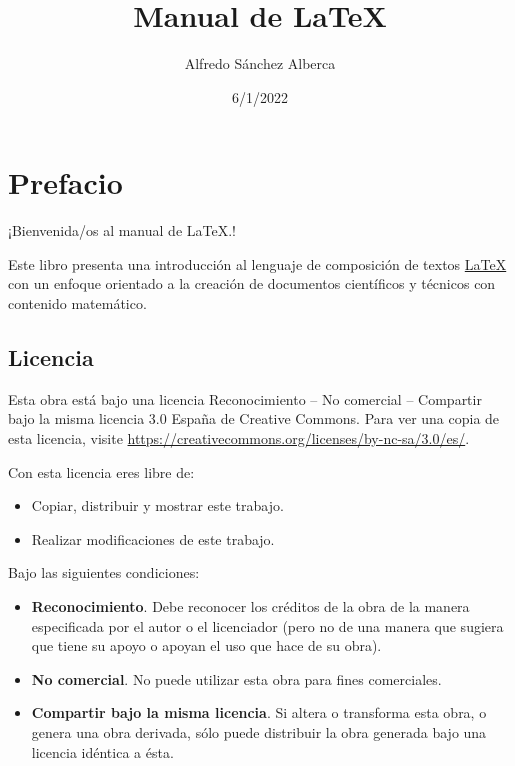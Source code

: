\documentclass[
  letterpaper,
  DIV=11,
  numbers=noendperiod]{scrreport}
\title{Manual de LaTeX}
\author{Alfredo Sánchez Alberca}
\date{6/1/2022}
\providecommand{\tightlist}{%
  \setlength{\itemsep}{0pt}\setlength{\parskip}{0pt}}\usepackage{longtable,booktabs,array}
\renewcommand*\contentsname{Indice de contenidos}
\newcommand\contentsname{Indice de contenidos}
\begin{document}
\maketitle
\ifdefined\Shaded\renewenvironment{Shaded}{\begin{tcolorbox}[breakable, interior hidden, frame hidden, boxrule=0pt, borderline west={3pt}{0pt}{shadecolor}, enhanced, sharp corners]}{\end{tcolorbox}}\fi

\renewcommand*\contentsname{Indice de contenidos}
{
\hypersetup{linkcolor=}
\setcounter{tocdepth}{2}
\tableofcontents
}

\hypertarget{prefacio}{%
\chapter*{Prefacio}\label{prefacio}}

¡Bienvenida/os al manual de \LaTeX.!

Este libro presenta una introducción al lenguaje de composición de
textos \href{https://www.latex-project.org/}{\LaTeX} con un enfoque
orientado a la creación de documentos científicos y técnicos con
contenido matemático.

\hypertarget{licencia}{%
\section*{Licencia}\label{licencia}}

Esta obra está bajo una licencia Reconocimiento -- No comercial --
Compartir bajo la misma licencia 3.0 España de Creative Commons. Para
ver una copia de esta licencia, visite
\url{https://creativecommons.org/licenses/by-nc-sa/3.0/es/}.

Con esta licencia eres libre de:

\begin{itemize}
\tightlist
\item
  Copiar, distribuir y mostrar este trabajo.
\item
  Realizar modificaciones de este trabajo.
\end{itemize}

Bajo las siguientes condiciones:

\begin{itemize}
\item
  \textbf{Reconocimiento}. Debe reconocer los créditos de la obra de la
  manera especificada por el autor o el licenciador (pero no de una
  manera que sugiera que tiene su apoyo o apoyan el uso que hace de su
  obra).
\item
  \textbf{No comercial}. No puede utilizar esta obra para fines
  comerciales.
\item
  \textbf{Compartir bajo la misma licencia}. Si altera o transforma esta
  obra, o genera una obra derivada, sólo puede distribuir la obra
  generada bajo una licencia idéntica a ésta.
\end{itemize}
\end{document}
